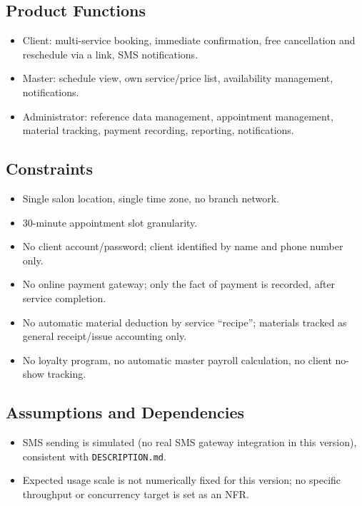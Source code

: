 \documentclass[11pt,a4paper]{article}
\begin{document}
\subsection{Product Functions}
\begin{itemize}[leftmargin=1.2cm]
  \item Client: multi-service booking, immediate confirmation, free
    cancellation and reschedule via a link, SMS notifications.
  \item Master: schedule view, own service/price list, availability
    management, notifications.
  \item Administrator: reference data management, appointment management,
    material tracking, payment recording, reporting, notifications.
\end{itemize}

\subsection{Constraints}
\label{sec:constraints}
\begin{itemize}[leftmargin=1.2cm]
  \item Single salon location, single time zone, no branch network.
  \item 30-minute appointment slot granularity.
  \item No client account/password; client identified by name and phone
    number only.
  \item No online payment gateway; only the fact of payment is recorded,
    after service completion.
  \item No automatic material deduction by service ``recipe''; materials
    tracked as general receipt/issue accounting only.
  \item No loyalty program, no automatic master payroll calculation, no
    client no-show tracking.
\end{itemize}

\subsection{Assumptions and Dependencies}
\begin{itemize}[leftmargin=1.2cm]
  \item SMS sending is simulated (no real SMS gateway integration in this
    version), consistent with \texttt{DESCRIPTION.md}.
  \item Expected usage scale is not numerically fixed for this version; no
    specific throughput or concurrency target is set as an NFR.
\end{itemize}
\end{document}
